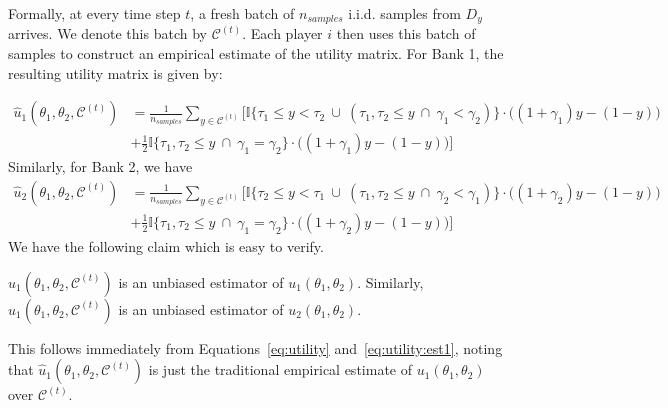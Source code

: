 Formally, at every time step $t$, a fresh batch of $n_{samples}$ i.i.d. samples from \( D_y \) arrives. We denote this batch by \( \mathcal{C}^{(t)} \). Each player $i$ then uses this batch of samples to construct an empirical estimate of the utility matrix. For Bank 1, the resulting utility matrix is given by: 


\begin{align}\label{eq:utility:est1}
    \widehat{u}_1(\theta_1, \theta_2, \mathcal{C}^{(t)}) 
    &=   \frac{1}{n_{samples}}\sum_{y\in\mathcal{C}^{(t)}}\bigg[\mathbb{I}\{{\tau_1 \leq y < \tau_2 \ \cup \ (\tau_1, \tau_2 \leq y \ \cap \ \gamma_1 < \gamma_2)}\} \cdot \big((1+\gamma_1)y - (1-y)\big) \nonumber \\
    & + \frac{1}{2} \mathbb{I}\{\tau_1, \tau_2 \leq y \ \cap \ \gamma_1 = \gamma_2\} \cdot \big((1+\gamma_1)y - (1-y)\big) \bigg]
\end{align}
%
Similarly, for Bank 2, we have 
\begin{align}\label{eq:utility:est2}
    \widehat{u}_2(\theta_1, \theta_2, \mathcal{C}^{(t)}) 
    &=  \frac{1}{n_{samples}}\sum_{y\in\mathcal{C}^{(t)}}\bigg[ \mathbb{I}\{{\tau_2 \leq y < \tau_1 \ \cup \ (\tau_1, \tau_2 \leq y \ \cap \ \gamma_2 < \gamma_1)}\} \cdot \big((1+\gamma_2)y - (1-y)\big) \nonumber \\
    & + \frac{1}{2} \mathbb{I}\{\tau_1, \tau_2 \leq y \ \cap \ \gamma_1 = \gamma_2\} \cdot \big((1+\gamma_2)y - (1-y)\big) \bigg]
\end{align}
We have the following claim which is easy to verify. 
\begin{claim}
$\widehat{u}_1(\theta_1, \theta_2, \mathcal{C}^{(t)})$ is an unbiased estimator of  
$ {u}_1(\theta_1, \theta_2)$. Similarly, $\widehat{u}_1(\theta_1, \theta_2, \mathcal{C}^{(t)})$ is an unbiased estimator of  
$ u_2(\theta_1, \theta_2)$.
\end{claim}
%
This follows immediately from Equations~\eqref{eq:utility} and~\eqref{eq:utility:est1}, noting that $\widehat{u}_1(\theta_1, \theta_2, \mathcal{C}^{(t)})$ is just the traditional empirical estimate of $u_1(\theta_1,\theta_2)$ over $\mathcal{C}^{(t)}$.

